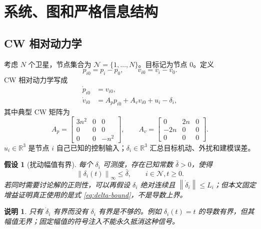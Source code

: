 \documentclass[UTF8,a4paper,12pt]{ctexart}
\newtheorem{assumption}{假设}
\newtheorem{remark}{说明}
\newcommand{\R}{\mathbb{R}}
\newcommand{\norm}[1]{\left\lVert #1\right\rVert}
\begin{document}
\section{系统、图和严格信息结构}

\subsection{CW 相对动力学}

考虑 $N$ 个卫星，节点集合为 $\mathcal N=\{1,\ldots,N\}$。目标记为节点 $0$。定义
\begin{equation}
  p_{i0}=p_i-p_0,\qquad v_{i0}=v_i-v_0.
\end{equation}
CW 相对动力学写成
\begin{equation}
\begin{aligned}
  \dot p_{i0}&=v_{i0},\\
  \dot v_{i0}&=A_pp_{i0}+A_vv_{i0}+u_i-\delta_i,
\end{aligned}
\label{eq:cw-agent}
\end{equation}
其中典型 CW 矩阵为
\begin{equation}
 A_p=\begin{bmatrix}3n^2&0&0\\0&0&0\\0&0&-n^2\end{bmatrix},\qquad
 A_v=\begin{bmatrix}0&2n&0\\-2n&0&0\\0&0&0\end{bmatrix}.
\end{equation}
$u_i\in\R^3$ 是节点 $i$ 自己已知的控制输入；$\delta_i\in\R^3$ 汇总目标机动、外扰和建模误差。

\begin{assumption}[扰动幅值有界]
每个 $\delta_i$ 可测度，存在已知常数 $\bar\delta>0$，使得
\begin{equation}
  \norm{\delta_i(t)}_\infty\le \bar\delta,
  \qquad i\in\mathcal N, t\ge0.
\label{eq:delta-bound}
\end{equation}
若同时需要讨论解的正则性，可以再假设 $\delta_i$ 绝对连续且 $\norm{\dot\delta_i}\le L_i$；但本文固定增益证明真正使用的是式 \eqref{eq:delta-bound}，不是导数上界。
\end{assumption}

\begin{remark}
只有 $\dot\delta_i$ 有界而没有 $\delta_i$ 有界是不够的。例如 $\delta_i(t)=t$ 的导数有界，但其幅值无界；固定幅值的符号注入不能永久抵消这种信号。
\end{remark}
\end{document}
